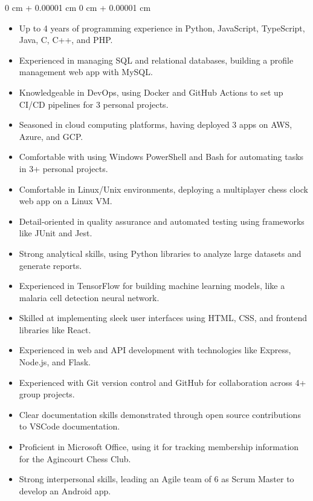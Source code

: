 \documentclass[10pt, letterpaper]{article}
\newenvironment{highlightsforbulletentries}{
    \begin{itemize}[
        topsep=0.10 cm,
        parsep=0.10 cm,
        partopsep=0pt,
        itemsep=0pt,
        leftmargin=10pt
    ]
}{
    \end{itemize}
} %
\newenvironment{onecolentry}{
    \begin{adjustwidth}{
        0 cm + 0.00001 cm
    }{
        0 cm + 0.00001 cm
    }
}{
    \end{adjustwidth}
} %
\begin{document}
    \begin{onecolentry}
        \begin{highlightsforbulletentries}


        \item Up to 4 years of programming experience in Python, JavaScript, TypeScript, Java, C, C++, and PHP.

        \item Experienced in managing SQL and relational databases, building a profile management web app with MySQL.

        \item Knowledgeable in DevOps, using Docker and GitHub Actions to set up CI/CD pipelines for 3 personal projects.

        \item Seasoned in cloud computing platforms, having deployed 3 apps on AWS, Azure, and GCP.

        \item Comfortable with using Windows PowerShell and Bash for automating tasks in 3+ personal projects.

        \item Comfortable in Linux/Unix environments, deploying a multiplayer chess clock web app on a Linux VM.

        \item Detail-oriented in quality assurance and automated testing using frameworks like JUnit and Jest.

        \item Strong analytical skills, using Python libraries to analyze large datasets and generate reports.

        \item Experienced in TensorFlow for building machine learning models, like a malaria cell detection neural network.

        \item Skilled at implementing sleek user interfaces using HTML, CSS, and frontend libraries like React.

        \item Experienced in web and API development with technologies like Express, Node.js, and Flask.

        \item Experienced with Git version control and GitHub for collaboration across 4+ group projects.

        \item Clear documentation skills demonstrated through open source contributions to VSCode documentation.

        \item Proficient in Microsoft Office, using it for tracking membership information for the Agincourt Chess Club.

        \item Strong interpersonal skills, leading an Agile team of 6 as Scrum Master to develop an Android app.


        \end{highlightsforbulletentries}
    \end{onecolentry}
\end{document}
